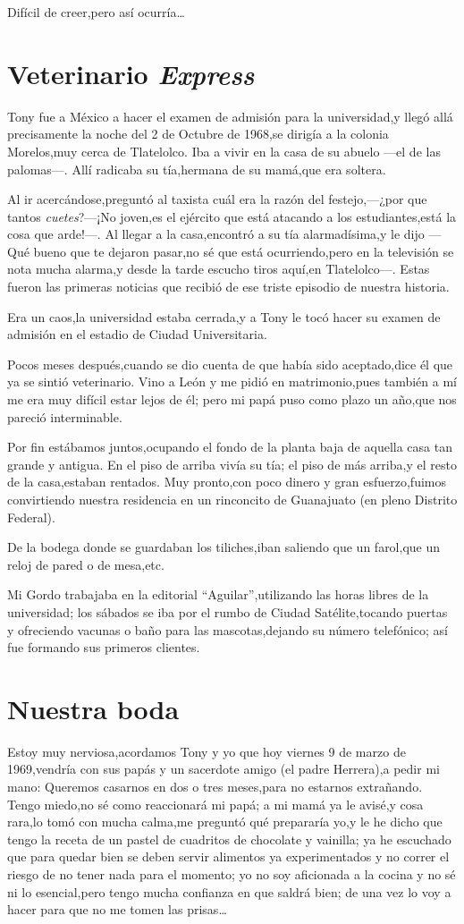 \documentclass[letterpaper,12pt]{book}
\begin{document}
Difícil de creer,pero así ocurría\ldots
\chapter{Veterinario {\it Express}}
Tony fue a México a hacer el examen de admisión para la universidad,y llegó allá precisamente la noche del 2 de Octubre de 1968,se dirigía a la colonia Morelos,muy cerca de Tlatelolco. Iba a vivir en la casa de su abuelo ---el de las palomas---. Allí radicaba su tía,hermana de su mamá,que era soltera. 

Al ir acercándose,preguntó al taxista cuál era la razón del festejo,---¿por que tantos {\it cuetes}?---¡No joven,es el ejército que está atacando a los estudiantes,está la cosa que arde!---.
Al llegar a la casa,encontró a su tía alarmadísima,y le dijo ---Qué bueno que te dejaron pasar,no sé que está ocurriendo,pero en la televisión se nota mucha alarma,y desde la tarde escucho tiros aquí,en Tlatelolco---. Estas fueron las primeras noticias que recibió de ese triste episodio de nuestra historia. 

Era un caos,la universidad estaba cerrada,y a Tony le tocó hacer su examen de admisión en el estadio de Ciudad Universitaria. 

Pocos meses después,cuando se dio cuenta de que había sido aceptado,dice él que ya se sintió veterinario. Vino a León y me pidió en matrimonio,pues también a mí me era muy difícil estar lejos de él; pero mi papá puso como plazo un año,que nos pareció interminable.

Por fin estábamos juntos,ocupando el fondo de la planta baja de aquella casa tan grande y antigua. En el piso de arriba vivía su tía; el piso de más arriba,y el resto de la casa,estaban rentados. Muy pronto,con poco dinero y gran esfuerzo,fuimos convirtiendo nuestra residencia en un rinconcito de Guanajuato (en pleno Distrito Federal).

De la bodega donde se guardaban los tiliches,iban saliendo que un farol,que un reloj de pared o de mesa,etc.

Mi Gordo trabajaba en la editorial ``Aguilar'',utilizando las horas libres de la universidad; los sábados se iba por el rumbo de Ciudad Satélite,tocando puertas y ofreciendo vacunas o baño para las mascotas,dejando su número telefónico; así fue formando sus primeros clientes.
\chapter{Nuestra boda}
Estoy muy nerviosa,acordamos Tony y yo que hoy viernes 9 de  marzo de 1969,vendría con sus papás y un sacerdote amigo (el padre Herrera),a pedir mi mano: Queremos casarnos en dos o tres meses,para no estarnos extrañando.  Tengo miedo,no sé como reaccionará mi papá; a mi mamá ya le avisé,y cosa rara,lo tomó con mucha calma,me preguntó qué prepararía yo,y le he dicho que tengo la receta de un pastel de cuadritos de chocolate y vainilla; ya he escuchado que para quedar bien se deben servir alimentos ya experimentados y no correr el riesgo de no tener nada para el momento; yo no soy aficionada a la cocina y no sé ni lo esencial,pero tengo mucha confianza en que saldrá bien; de una vez lo voy a hacer para que no me tomen las prisas\ldots
\end{document}
